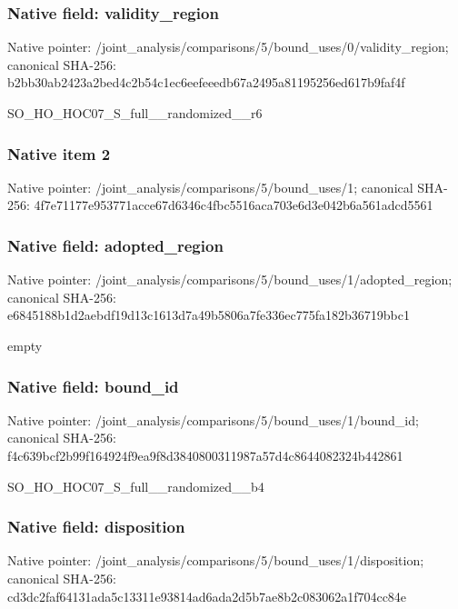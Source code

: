 \documentclass[10pt,a4paper]{article}
\begin{document}
\subsubsection{Native field: validity\_\allowbreak{}region}
Native pointer: /joint\_\allowbreak{}analysis/comparisons/5/bound\_\allowbreak{}uses/0/validity\_\allowbreak{}region; canonical SHA-256: b2bb30ab2423a2bed4c2b54c1ec6eefeeedb67a2495a81195256ed617b9faf4f

\begingroup\raggedright\sloppy SO\_\allowbreak{}HO\_\allowbreak{}HOC07\_\allowbreak{}S\_\allowbreak{}full\_\allowbreak{}\_\allowbreak{}randomized\_\allowbreak{}\_\allowbreak{}r6\par\endgroup

\subsubsection{Native item 2}
Native pointer: /joint\_\allowbreak{}analysis/comparisons/5/bound\_\allowbreak{}uses/1; canonical SHA-256: 4f7e71177e953771acce67d6346c4fbc5516aca703e6d3e042b6a561adcd5561

\subsubsection{Native field: adopted\_\allowbreak{}region}
Native pointer: /joint\_\allowbreak{}analysis/comparisons/5/bound\_\allowbreak{}uses/1/adopted\_\allowbreak{}region; canonical SHA-256: e6845188b1d2aebdf19d13c1613d7a49b5806a7fe336ec775fa182b36719bbc1

\begingroup\raggedright\sloppy empty\par\endgroup

\subsubsection{Native field: bound\_\allowbreak{}id}
Native pointer: /joint\_\allowbreak{}analysis/comparisons/5/bound\_\allowbreak{}uses/1/bound\_\allowbreak{}id; canonical SHA-256: f4c639bcf2b99f164924f9ea9f8d3840800311987a57d4c8644082324b442861

\begingroup\raggedright\sloppy SO\_\allowbreak{}HO\_\allowbreak{}HOC07\_\allowbreak{}S\_\allowbreak{}full\_\allowbreak{}\_\allowbreak{}randomized\_\allowbreak{}\_\allowbreak{}b4\par\endgroup

\subsubsection{Native field: disposition}
Native pointer: /joint\_\allowbreak{}analysis/comparisons/5/bound\_\allowbreak{}uses/1/disposition; canonical SHA-256: cd3dc2faf64131ada5c13311e93814ad6ada2d5b7ae8b2c083062a1f704cc84e
\end{document}
